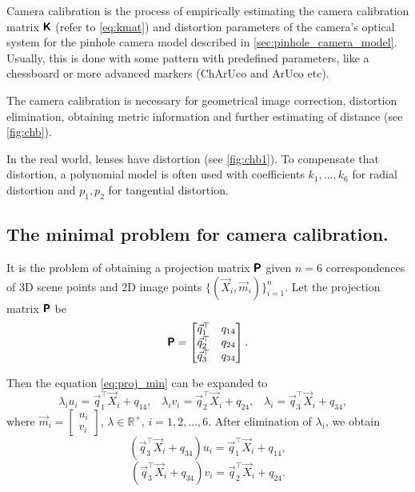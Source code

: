 Camera calibration is the process of empirically estimating the camera calibration matrix $\pmb{\mathsf{K}}$ (refer to \eqref{eq:kmat}) and distortion parameters of the camera's optical system for the pinhole camera model described in \autoref{sec:pinhole_camera_model}.
Usually, this is done with some pattern with predefined parameters, like a chessboard or more advanced markers (ChArUco and ArUco \cite{aruco} etc).

The camera calibration is necessary for geometrical image correction, distortion elimination, obtaining metric information and further estimating of distance (see \autoref{fig:chb}). 

In the real world, lenses have distortion (see \autoref{fig:chb1}).
To compensate that distortion, a polynomial model is often used with coefficients $k_1, ... , k_6$ for radial distortion and $p_1, p_2$ for tangential distortion.

\subsection{The minimal problem for camera calibration.} 
It is the problem of obtaining a projection matrix $\pmb{\mathsf{P}}$ given $n=6$ correspondences of 3D scene points and 2D image points $\{(\vec{X}_i, \vec{m}_i)\}_{i=1}^n$.
Let the projection matrix $\pmb{\mathsf{P}}$ be 
\begin{equation}
    \label{eq:p_calib}
    \pmb{\mathsf{P}} = \begin{bmatrix}
        \vec{q}_1^\top & q_{14} \\
        \vec{q}_2^\top & q_{24} \\
        \vec{q}_3^\top & q_{34} \\
    \end{bmatrix}.
\end{equation}

Then the equation \eqref{eq:proj_min} can be expanded to
\begin{equation}
    \lambda_i u_i = \vec{q}_1^\top \vec{X}_i + q_{14}, \;\;\;
    \lambda_i v_i = \vec{q}_2^\top \vec{X}_i + q_{24}, \;\;\;
    \lambda_i = \vec{q}_3^\top \vec{X}_i + q_{34}, \;\;\;
\end{equation}
where $\vec{m}_i = \begin{bmatrix} u_i \\ v_i \end{bmatrix}$, $ \lambda \in \mathbb{R}^{+}$, $i = 1, 2, ..., 6$.
After elimination of $\lambda_i$, we obtain
\begin{equation}
    (\vec{q}_3^\top \vec{X}_i + q_{34})u_i = \vec{q}_1^\top \vec{X}_i + q_{14},
\end{equation}
\begin{equation}
    (\vec{q}_3^\top \vec{X}_i + q_{34})v_i = \vec{q}_2^\top \vec{X}_i + q_{24}.
\end{equation}


